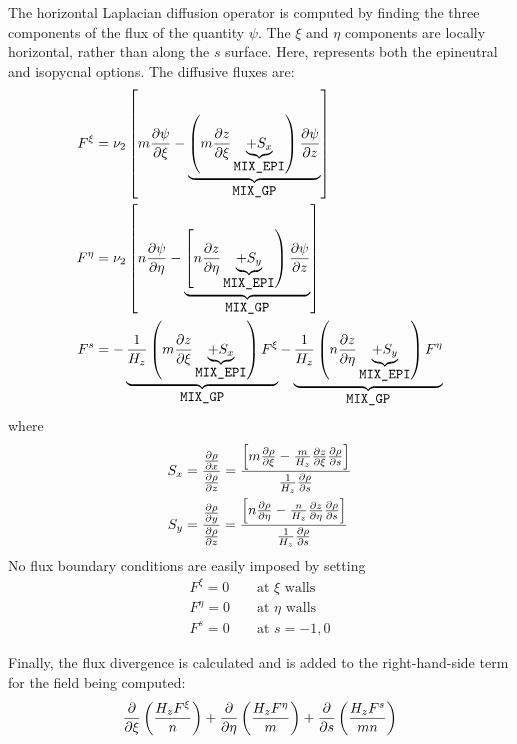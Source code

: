 The horizontal Laplacian diffusion operator is computed by finding the
three components of the flux of the quantity $\psi$.  The $\xi$ and
$\eta$ components are locally horizontal, rather than along the
$s$ surface. Here,  represents both the epineutral and
isopycnal options. The diffusive fluxes are:
\begin{align}
   F^\xi & = \nu_2 \left[ m
   {\partial \psi \over \partial \xi} -
   \underbrace{ \left( m {\partial z \over \partial \xi}
   \underbrace{+ S_x }_{\mbox{\tt MIX\_EPI}} \right)
   {\partial \psi \over \partial z} }_{\mbox{\tt MIX\_GP}} \right]
\label{fluxx}
\\
   F^\eta & = \nu_2 \left[ n
   {\partial \psi \over \partial \eta} -
   \underbrace{ \left[ n {\partial z \over \partial \eta}
   \underbrace{+ S_y }_{\mbox{\tt MIX\_EPI}} \right)
   {\partial \psi \over \partial z} }_{\mbox{\tt MIX\_GP}} \right]
\label{fluxy}
\\
   F^s & =
   - \underbrace{ {1 \over H_z} \left( m
   {\partial z \over \partial \xi}
   \underbrace{+ S_x }_{\mbox{\tt MIX\_EPI}} \right)
   F^\xi }_{\mbox{\tt MIX\_GP}}
   - \underbrace{ {1 \over H_z} \left( n
   {\partial z \over \partial \eta}
   \underbrace{+ S_y }_{\mbox{\tt MIX\_EPI}} \right)
   F^\eta }_{\mbox{\tt MIX\_GP}}
\label{fluxs}
\end{align}
where
\begin{align*}
  S_x & = { { \partial \rho \over \partial x} \over
    { \partial \rho \over \partial z} } =
    { \left[ m {\partial \rho \over \partial \xi} -
    {m \over H_z} {\partial z \over \partial \xi}
    { \partial \rho \over \partial s} \right] \over
    {1 \over H_z} {\partial \rho \over \partial s} }
\\
  S_y & = { { \partial \rho \over \partial y} \over
    { \partial \rho \over \partial z} } =
    { \left[ n {\partial \rho \over \partial \eta} -
    {n \over H_z} {\partial z \over \partial \eta}
    { \partial \rho \over \partial s} \right] \over
    {1 \over H_z} {\partial \rho \over \partial s} }
\end{align*}
No flux boundary conditions are easily imposed by setting
\begin{eqnarray*}
  F^\xi = 0    && \mbox{ at $\xi$ walls} \\
  F^\eta = 0   && \mbox{ at $\eta$ walls} \\
  F^s = 0 && \mbox{ at $s = -1,0$}
\end{eqnarray*}

Finally, the flux divergence is calculated and is added to the
right-hand-side term for the field being computed:
\begin{equation}
  {\partial \over \partial \xi} \left( { H_z F^\xi \over n} \right) +
  {\partial \over \partial \eta} \left( { H_z F^\eta \over m} \right) +
  {\partial \over \partial s}
  \left( { H_z F^s \over mn} \right)
\label{rot1}
\end{equation}

